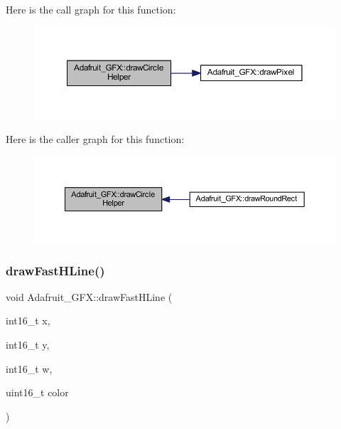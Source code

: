 Here is the call graph for this function\+:\nopagebreak
\begin{figure}[H]
\begin{center}
\leavevmode
\includegraphics[width=350pt]{class_adafruit___g_f_x_a3f2dd7b698e7b95ebf9fecf992ff802e_cgraph}
\end{center}
\end{figure}
Here is the caller graph for this function\+:\nopagebreak
\begin{figure}[H]
\begin{center}
\leavevmode
\includegraphics[width=350pt]{class_adafruit___g_f_x_a3f2dd7b698e7b95ebf9fecf992ff802e_icgraph}
\end{center}
\end{figure}
\mbox{\label{class_adafruit___g_f_x_a4d42e7cc577c1eb5b06fe656786c9c79}} 
\subsubsection{\texorpdfstring{draw\+Fast\+H\+Line()}{drawFastHLine()}}
{\footnotesize\ttfamily void Adafruit\+\_\+\+G\+F\+X\+::draw\+Fast\+H\+Line (\begin{DoxyParamCaption}\item[{int16\+\_\+t}]{x,  }\item[{int16\+\_\+t}]{y,  }\item[{int16\+\_\+t}]{w,  }\item[{uint16\+\_\+t}]{color }\end{DoxyParamCaption})}

